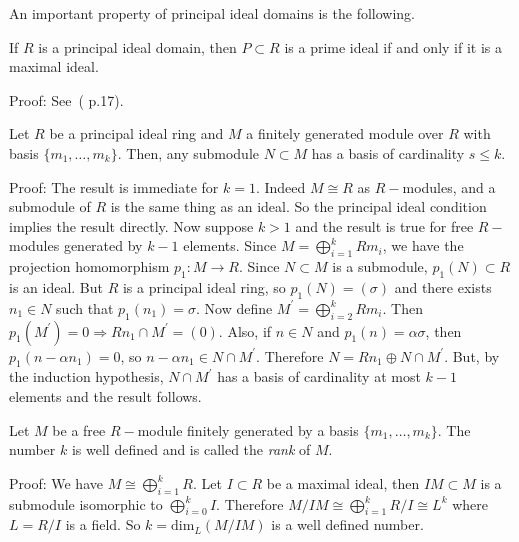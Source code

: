 An important property of principal ideal domains is the following.
\begin{dang}
\begin{theorem}\label{In_PID_every_primeIdeal_is_maximal}
    If $R$ is a principal ideal domain, then $P\subset R$ is a prime ideal if and only if it is a maximal ideal.
\end{theorem}
\end{dang}
Proof: See~(\cite{lidl1994introduction} p.17).
\begin{dang}
    \begin{theorem}\label{submodule_ofa_free_module_is_free}\cite{curtis1966representation}
        Let $R$ be a principal ideal ring and $M$ a finitely generated module over $R$ with basis $\{m_1,\dots,m_k\}$. Then, any submodule $N\subset M$ has a basis of cardinality $s\leq k$.
    \end{theorem}
\end{dang}
Proof: The result is immediate for $k=1$. Indeed $M\cong R$ as $R-$modules, and a submodule of $R$ is the same thing as an ideal. So the principal ideal condition implies the result directly. Now suppose $k>1$ and the result is true for free $R-$modules generated by $k-1$ elements. Since $M=\bigoplus_{i=1}^{k}Rm_i$, we have the projection homomorphism $p_1:M\rightarrow R$. Since $N\subset M$ is a submodule, $p_1(N)\subset R$ is an ideal. But $R$ is a principal ideal ring, so $p_1(N)=(\sigma)$ and there exists $n_1\in N$ such that $p_1(n_1)=\sigma$. Now define $M^\prime=\bigoplus_{i=2}^{k}Rm_i$. Then $p_1(M^\prime)=0\Rightarrow Rn_1\cap M^\prime=(0)$. Also, if $n\in N$ and $p_1(n)=\alpha\sigma$, then $p_1(n-\alpha n_1)=0$, so $n-\alpha n_1\in N\cap M^\prime$. Therefore $N=Rn_1\oplus N\cap M^\prime$. But, by the induction hypothesis, $N\cap M^\prime$ has a basis of cardinality at most $k-1$ elements and the result follows.
\begin{dang}
    \begin{theorem}\cite{curtis1966representation}
        Let $M$ be a free $R-$module finitely generated by a basis $\{m_1,\dots,m_k\}$. The number $k$ is well defined and is called the \textit{rank} of $M$.
    \end{theorem}
\end{dang}
Proof: We have $M\cong\bigoplus_{i=1}^kR$. Let $I\subset R$ be a maximal ideal, then $IM\subset M$ is a submodule isomorphic to $\bigoplus_{i=0}^kI$. Therefore $M/IM\cong \bigoplus_{i=1}^kR/I \cong L^k$ where $L=R/I$ is a field. So $k=\text{dim}_L(M/IM)$ is a well defined number.

